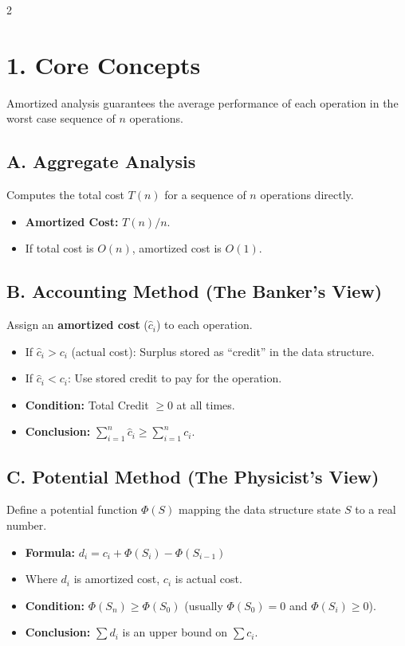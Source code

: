 \documentclass[10pt, a4paper]{article}
\newcommand{\amortized}{\hat{c}_i}
\newcommand{\actual}{c_i}
\newcommand{\potential}{\Phi}
\begin{document}
\begin{multicols*}{2}

\section{1. Core Concepts}
Amortized analysis guarantees the average performance of each operation in the worst case sequence of $n$ operations.

\subsection*{A. Aggregate Analysis}
Computes the total cost $T(n)$ for a sequence of $n$ operations directly.
\begin{itemize}
    \item \textbf{Amortized Cost:} $T(n) / n$.
    \item If total cost is $O(n)$, amortized cost is $O(1)$.
\end{itemize}

\subsection*{B. Accounting Method (The Banker's View)}
Assign an \textbf{amortized cost} ($\amortized$) to each operation.
\begin{itemize}
    \item If $\amortized > \actual$ (actual cost): Surplus stored as ``credit'' in the data structure.
    \item If $\amortized < \actual$: Use stored credit to pay for the operation.
    \item \textbf{Condition:} Total Credit $\ge 0$ at all times.
    \item \textbf{Conclusion:} $\sum_{i=1}^n \amortized \ge \sum_{i=1}^n \actual$.
\end{itemize}

\subsection*{C. Potential Method (The Physicist's View)}
Define a potential function $\potential(S)$ mapping the data structure state $S$ to a real number.
\begin{itemize}
    \item \textbf{Formula:} $d_i = \actual + \potential(S_i) - \potential(S_{i-1})$
    \item Where $d_i$ is amortized cost, $\actual$ is actual cost.
    \item \textbf{Condition:} $\potential(S_n) \ge \potential(S_0)$ (usually $\potential(S_0) = 0$ and $\potential(S_i) \ge 0$).
    \item \textbf{Conclusion:} $\sum d_i$ is an upper bound on $\sum \actual$.
\end{itemize}


\end{multicols*}
\end{document}
